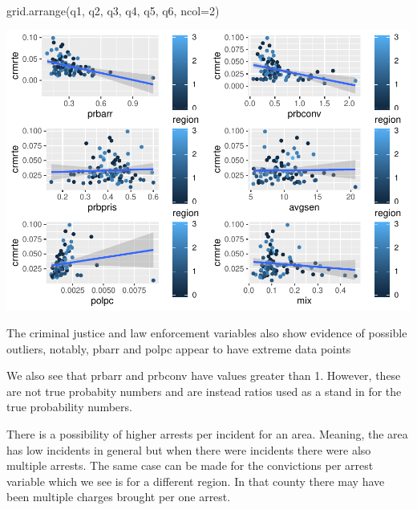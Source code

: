 \documentclass[]{article}
\newenvironment{Shaded}{}{}
\newcommand{\DataTypeTok}[1]{#1}
\newcommand{\DecValTok}[1]{#1}
\newcommand{\KeywordTok}[1]{\textcolor[rgb]{0.00,0.00,1.00}{#1}}
\newcommand{\NormalTok}[1]{#1}
\begin{document}
\begin{Shaded}
\begin{Highlighting}[]
\KeywordTok{grid.arrange}\NormalTok{(q1, q2, q3, q4, q5, q6, }\DataTypeTok{ncol=}\DecValTok{2}\NormalTok{)}
\end{Highlighting}
\end{Shaded}

\includegraphics{Bagnard_Gaustad_Hartman_Leung_Lab_3_files/figure-latex/unnamed-chunk-25-1.pdf}

The criminal justice and law enforcement variables also show evidence of
possible outliers, notably, pbarr and polpc appear to have extreme data
points

We also see that prbarr and prbconv have values greater than 1. However,
these are not true probabity numbers and are instead ratios used as a
stand in for the true probability numbers.

There is a possibility of higher arrests per incident for an area.
Meaning, the area has low incidents in general but when there were
incidents there were also multiple arrests. The same case can be made
for the convictions per arrest variable which we see is for a different
region. In that county there may have been multiple charges brought per
one arrest.
\end{document}
